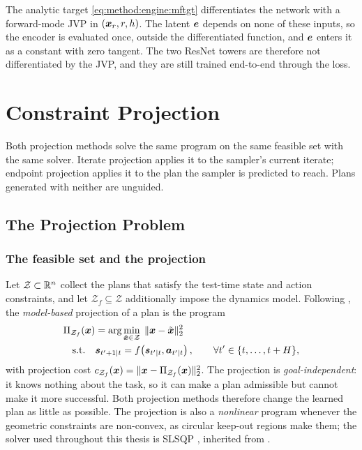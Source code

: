 The analytic target \eqref{eq:method:engine:mftgt} differentiates the network with a forward-mode
\ac{JVP} in $(\boldsymbol{x}_{r},r,h)$. The latent $\boldsymbol{e}$ depends on none of these inputs, so the encoder
is evaluated once, outside the differentiated function, and $\boldsymbol{e}$ enters it as a constant with
zero tangent. The two ResNet towers are therefore not differentiated by the \ac{JVP}, and they are
still trained end-to-end through the loss.

\section{Constraint Projection}\label{sec:method:projection}

Both projection methods solve the same program on the same feasible set with the same solver. Iterate
projection applies it to the sampler's current iterate; endpoint projection applies it to the plan the
sampler is predicted to reach. Plans generated with neither are unguided.

\subsection{The Projection Problem}\label{sec:method:proj}

\subsubsection*{The feasible set and the projection}

Let $\mathcal{Z} \subset \mathbb{R}^{n}$ collect the plans that satisfy the test-time state and action
constraints, and let $\mathcal{Z}_{f} \subseteq \mathcal{Z}$ additionally impose the dynamics
model. Following \parencite[Eq.~(9)]{romer2025diffusion}, the \emph{model-based} projection of a plan is the
program
\begin{align}
  \Pi_{\mathcal{Z}_{f}}(\boldsymbol{x})
    &= \arg\min_{\tilde{\boldsymbol{x}}\in\mathcal{Z}} \;\|\boldsymbol{x}-\tilde{\boldsymbol{x}}\|_{2}^{2}
    \label{eq:bg:mpc:proj} \\
  \text{s.t.}\quad & \boldsymbol{s}_{t'+1|t} = f\!\left(\boldsymbol{s}_{t'|t},\boldsymbol{a}_{t'|t}\right),
    \qquad \forall t' \in \{t,\dots,t+H\},
    \label{eq:bg:mpc:dyn}
\end{align}
with projection cost $c_{\mathcal{Z}_{f}}(\boldsymbol{x}) = \|\boldsymbol{x}-\Pi_{\mathcal{Z}_{f}}(\boldsymbol{x})\|_{2}^{2}$.
The projection is \emph{goal-independent}: it knows nothing about the task, so it can make a
plan admissible but cannot make it more successful. Both projection methods therefore
change the learned plan as little as possible. The projection is
also a \emph{nonlinear} program whenever the geometric
constraints are non-convex, as circular keep-out regions make them; the solver used throughout
this thesis is \ac{SLSQP}
\parencite{kraft1988software,virtanen2020scipy}, inherited from \parencite{romer2025diffusion}.

